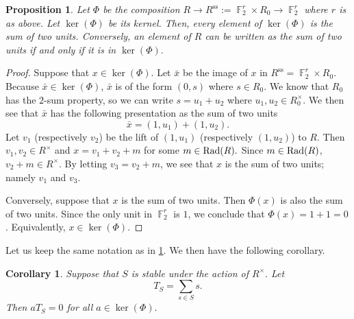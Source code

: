 \documentclass[11pt, a4paper]{amsart}
\newtheorem{prop}[thm]{Proposition}
\newtheorem{cor}[thm]{Corollary}
\theoremstyle{definition}
\DeclareMathOperator{\F}{\mathbb{F}}
\numberwithin{equation}{section}
\newcommand{\Rad}{{\rm Rad}}
\newcommand{\s}{\text{ss}}
\begin{document}
\begin{prop} \label{prop:which-element-sum-2}
  Let $\Phi$ be the composition $R \to R^{\s}:=\F_2^r \times R_0 \to \F_2^r$ where $r$ is as above. Let $\ker(\Phi)$ be its kernel. Then, every element of $\ker(\Phi)$ is the sum of two units. Conversely, an element of $R$ can be written as the sum of two units if and only if it is in $\ker(\Phi).$
\end{prop}

\begin{proof}
Suppose that $x \in \ker(\Phi)$. Let $\bar{x}$ be the image of $x$ in $R^{\s}=\F_2^r \times R_0.$ Because $\bar{x} \in \ker(\Phi)$, $\bar{x}$ is of the form $(0,s)$ where $s \in R_0.$ We know that $R_0$ has the $2$-sum property, so we can write $s=u_1+u_2$ where $u_1, u_2 \in R_0^{\times}.$ We then see that $\bar{x} $ has the following presentation as the sum of two units
\[ \bar{x}=(1,u_1)+(1,u_2).\]
Let $v_1$ (respectively $v_2$) be the lift of $(1,u_1)$ (respectively $(1,u_2)$) to $R.$ Then $v_1, v_2 \in R^{\times}$ and $x =v_1+v_2+m$ for some $m \in \Rad(R).$ Since $m \in \Rad(R)$, $v_2+m \in R^{\times}.$ By letting $v_3=v_2+m$, we see that $x$ is the sum of two units; namely $v_1$ and $v_3.$


Conversely, suppose that $x$ is the sum of two units. Then $\Phi(x)$ is also the sum of two units. Since the only unit in $\F_2^r$ is $1$, we conclude that $\Phi(x)=1+1=0$. Equivalently, $x \in \ker(\Phi).$
\end{proof}
Let us keep the same notation as in \cref{prop:which-element-sum-2}. We then have the following corollary. 
\begin{cor}
    Suppose that $S$ is stable under the action of $R^{\times}.$ Let 
    \[ T_{S} = \sum_{s \in S} s.\]
    Then $aT_{S}=0$ for all $a \in \ker(\Phi).$ 

 
\end{cor}
\end{document}
